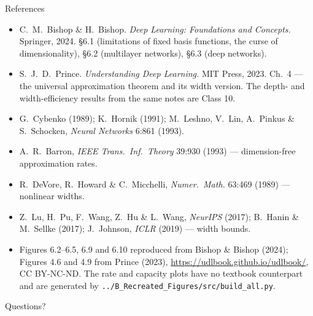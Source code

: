 \documentclass[aspectratio=169, 11pt]{beamer}
\newcommand{\nosrc}{}       %
\begin{document}
\begin{frame}{References}
  \nosrc
  \scriptsize
  \begin{itemize}\setlength{\itemsep}{0pt}
    \item C.~M.~Bishop \& H.~Bishop. \textit{Deep Learning: Foundations
          and Concepts.} Springer, 2024. \S6.1 (limitations of fixed
          basis functions, the curse of dimensionality), \S6.2
          (multilayer networks), \S6.3 (deep networks).
    \item S.~J.~D.~Prince. \textit{Understanding Deep Learning.}
          MIT Press, 2023. Ch.~4 --- the universal approximation
          theorem and its width version. The depth- and
          width-efficiency results from the same notes are Class 10.
    \item G.~Cybenko (1989); K.~Hornik (1991); M.~Leshno, V.~Lin,
          A.~Pinkus \& S.~Schocken, \textit{Neural Networks} 6:861
          (1993).
    \item A.~R.~Barron, \textit{IEEE Trans.\ Inf.\ Theory} 39:930
          (1993) --- dimension-free approximation rates.
    \item R.~DeVore, R.~Howard \& C.~Micchelli, \textit{Numer.\ Math.}
          63:469 (1989) --- nonlinear widths.
    \item Z.~Lu, H.~Pu, F.~Wang, Z.~Hu \& L.~Wang, \textit{NeurIPS}
          (2017); B.~Hanin \& M.~Sellke (2017); J.~Johnson,
          \textit{ICLR} (2019) --- width bounds.
    \item Figures 6.2--6.5, 6.9 and 6.10 reproduced from Bishop \&
          Bishop (2024); Figures 4.6 and 4.9 from Prince (2023),
          \url{https://udlbook.github.io/udlbook/}, CC BY-NC-ND.
          The rate and capacity plots have no textbook counterpart and
          are generated by
          \texttt{../B\_Recreated\_Figures/src/build\_all.py}.
  \end{itemize}
\end{frame}

\begin{frame}[standout]
  \nosrc
  Questions?
\end{frame}
\end{document}
